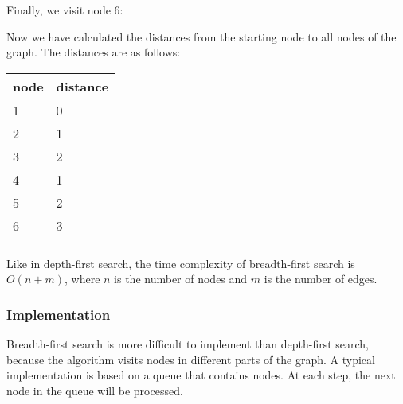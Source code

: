 Finally, we visit node 6:
\begin{center}
\end{center}
Now we have calculated the distances
from the starting node to all nodes of the graph.
The distances are as follows:

\begin{tabular}{ll}
\\
node & distance \\
\hline
1 & 0 \\
2 & 1 \\
3 & 2 \\
4 & 1 \\
5 & 2 \\
6 & 3 \\
\\
\end{tabular}

Like in depth-first search,
the time complexity of breadth-first search
is $O(n+m)$, where $n$ is the number of nodes
and $m$ is the number of edges.

\subsubsection*{Implementation}

Breadth-first search is more difficult
to implement than depth-first search,
because the algorithm visits nodes
in different parts of the graph.
A typical implementation is based on
a queue that contains nodes.
At each step, the next node in the queue
will be processed.

